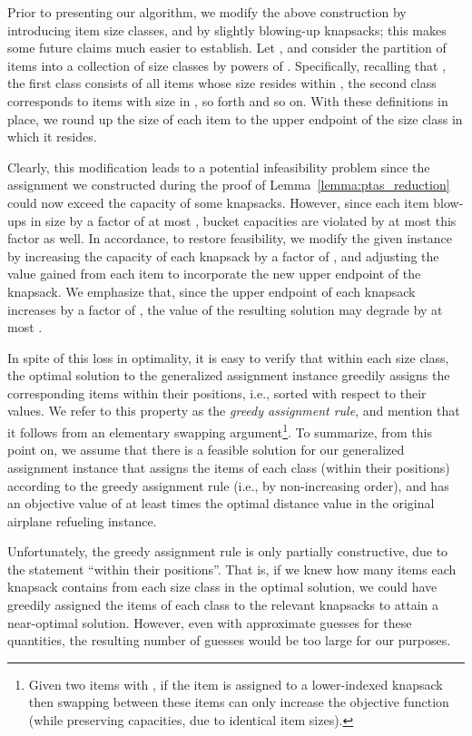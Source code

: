 \documentclass[11pt]{article}
\theoremstyle{plain}
\theoremstyle{definition}
\begin{document}
\smallskip {} Prior to presenting our algorithm, we modify the
above construction by introducing item size classes, and by slightly blowing-up knapsacks; this makes some future claims much easier to establish. Let , and consider the partition of items into a collection of  size classes by powers of . Specifically, recalling that , the first class consists of all items whose size resides within , the second class corresponds to items with size in  , so forth and so on. With these definitions in place, we round up the size  of each item  to the upper endpoint of the size class in which it resides.

Clearly, this modification leads to a potential infeasibility problem since the assignment we constructed during the proof of Lemma~\ref{lemma:ptas_reduction} could now exceed the capacity of some knapsacks. However, since each item blow-ups in size by a factor of at most , bucket capacities are violated by at most this factor as well. In accordance, to restore feasibility, we modify the given instance by increasing the capacity of each knapsack by a factor of , and adjusting the value gained from each item to incorporate the new upper endpoint of the knapsack. We emphasize that, since the upper endpoint of each knapsack increases by a factor of , the value of the resulting solution may degrade by at most .

In spite of this loss in optimality, it is easy to verify that within each size class, the optimal solution to the generalized assignment instance greedily assigns the corresponding items within their positions, i.e., sorted with respect to their  values. We refer to this property as the {\em greedy assignment rule}, and mention that it follows from an elementary swapping argument\footnote{Given two items  with , if the item  is assigned to a lower-indexed knapsack then swapping between these items can only increase the objective function (while preserving capacities, due to identical item sizes).}. To summarize, from this point on, we assume that there is a feasible solution for our generalized assignment instance that assigns the items of each class (within their positions) according to the greedy assignment rule (i.e., by non-increasing  order), and has an objective value of at least  times the optimal distance value in the original airplane refueling instance.

\smallskip {} Unfortunately, the greedy assignment rule is only partially constructive, due to the statement ``within their positions''. That is, if we knew how many items each knapsack contains from each size class in the optimal solution, we could have greedily assigned the items of each class to the relevant knapsacks to attain a near-optimal solution. However, even with approximate guesses for these quantities, the resulting number of guesses would be too large for our purposes.
\end{document}
